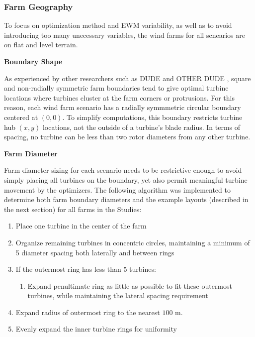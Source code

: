 \subsubsection{Farm Geography}
	To focus on optimization method and EWM variability, as well as to avoid introducing too many unecessary variables, the wind farms for all scnearios are on flat and level terrain.

\vspace{3mm}
\noindent\textbf{Boundary Shape}

	\noindent As experienced by other researchers such as DUDE \cite{} and OTHER DUDE \cite{}, square and non-radially symmetric farm boundaries tend to give optimal turbine locations where turbines cluster at the farm corners or protrusions.
	For this reason, each wind farm scenario has a radially symmmetric circular boundary centered at $(0, 0)$.
	To simplify computations, this boundary restricts turbine hub $(x, y)$ locations, not the outside of a turbine's blade radius.
	In terms of spacing, no turbine can be less than two rotor diameters from any other turbine.

\vspace{3mm}
\noindent\textbf{Farm Diameter}

	\noindent Farm diameter sizing for each scenario needs to be restrictive enough to avoid simply placing all turbines on the boundary, yet also permit meaningful turbine movement by the optimizers.
	The following algorithm was implemented to determine both farm boundary diameters and the example layouts (described in the next section) for all farms in the Studies:

    \begin{enumerate}
        \item Place one turbine in the center of the farm
        \item Organize remaining turbines in concentric circles, maintaining a minimum of 5 diameter spacing both laterally and between rings
        \item If the outermost ring has less than 5 turbines:
        \begin{enumerate}
            \item Expand penultimate ring as little as possible to fit these outermost turbines, while maintaining the lateral spacing requirement
        \end{enumerate}
        \item Expand radius of outermost ring to the nearest $100$ m.
        \item Evenly expand the inner turbine rings for uniformity
    \end{enumerate}


